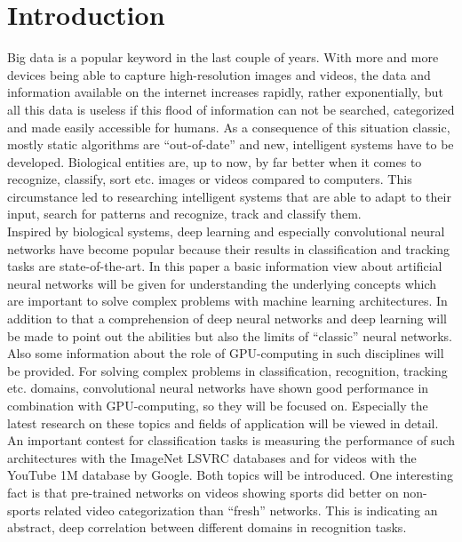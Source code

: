 \documentclass[12pt,twoside]{article}
\theoremstyle{plain}
\theoremstyle{definition}
\theoremstyle{remark}
\begin{document}






\section{Introduction}
\label{sec:introduction}

Big data is a popular keyword in the last couple of years. With more and more devices being able to capture high-resolution images and videos, the data and information available on the internet increases rapidly, rather exponentially, but all this data is useless if this flood of information can not be searched, categorized and made easily accessible for humans. As a consequence of this situation classic, mostly static algorithms are \enquote{out-of-date} and new, intelligent systems have to be developed. Biological entities are, up to now, by far better when it comes to recognize, classify, sort etc. images or videos compared to computers. This circumstance led to researching intelligent systems that are able to adapt to their input, search for patterns and recognize, track and classify them.
\\
Inspired by biological systems, deep learning and especially convolutional neural networks have become popular because their results in classification and tracking tasks are state-of-the-art. In this paper a basic information view about artificial neural networks will be given for understanding the underlying concepts which are important to solve complex problems with machine learning architectures. In addition to that a comprehension of deep neural networks and deep learning will be made to point out the abilities but also the limits of \enquote{classic} neural networks. Also some information about the role of GPU-computing in such disciplines will be provided. For solving complex problems in classification, recognition, tracking etc. domains, convolutional neural networks have shown good performance in combination with GPU-computing, so they will be focused on. Especially the latest research on these topics and fields of application will be viewed in detail. An important contest for classification tasks is measuring the performance of such architectures with the ImageNet LSVRC databases and for videos with the YouTube 1M database by Google. Both topics will be introduced. One interesting fact is that pre-trained networks on videos showing sports did better on non-sports related video categorization than \enquote{fresh} networks. This is indicating an abstract, deep correlation between different domains in recognition tasks.
\end{document}
